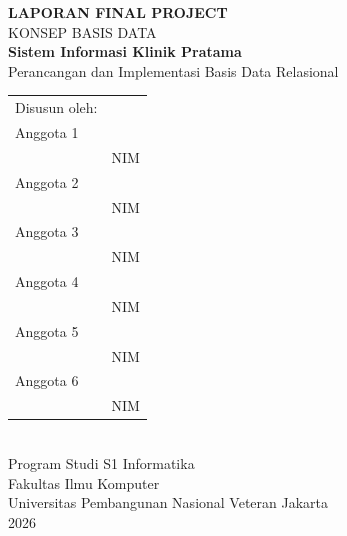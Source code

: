 \documentclass[12pt,a4paper]{article}
\begin{document}
\begin{titlepage}
  \centering
  \vspace*{1.5cm}
  {\Large\textbf{LAPORAN FINAL PROJECT}}\\[0.5em]
  {\large KONSEP BASIS DATA}\\[2em]

  {\LARGE\textbf{Sistem Informasi Klinik Pratama}}\\[1em]
  {\large Perancangan dan Implementasi Basis Data Relasional}\\[3em]

  \begin{tabular}{ll}
    Disusun oleh: & \\[0.6em]
    Anggota 1 & \underline{\hspace{5cm}} \\
              & NIM \underline{\hspace{3cm}} \\[0.4em]
    Anggota 2 & \underline{\hspace{5cm}} \\
              & NIM \underline{\hspace{3cm}} \\[0.4em]
    Anggota 3 & \underline{\hspace{5cm}} \\
              & NIM \underline{\hspace{3cm}} \\[0.4em]
    Anggota 4 & \underline{\hspace{5cm}} \\
              & NIM \underline{\hspace{3cm}} \\[0.4em]
    Anggota 5 & \underline{\hspace{5cm}} \\
              & NIM \underline{\hspace{3cm}} \\[0.4em]
    Anggota 6 & \underline{\hspace{5cm}} \\
              & NIM \underline{\hspace{3cm}} \\
  \end{tabular}\\[2.5em]

  {\large Program Studi S1 Informatika}\\
  {\large Fakultas Ilmu Komputer}\\
  {\large Universitas Pembangunan Nasional Veteran Jakarta}\\
  {\large 2026}
\end{titlepage}
\end{document}
